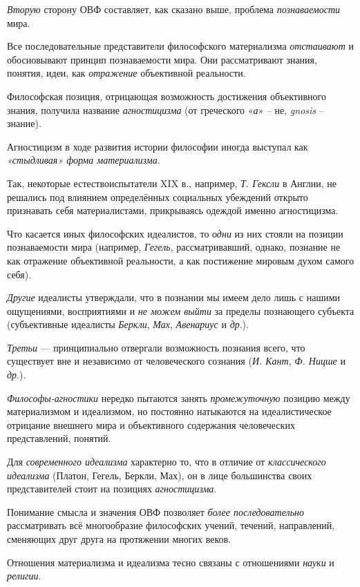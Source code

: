 \documentclass[a4paper,14pt,russian]{extreport}
\begin{document}
\emph{Вторую} сторону ОВФ составляет, как сказано выше, проблема \emph{познаваемости} мира.

Все последовательные представители философского материализма \emph{отстаивают} и обосновывают принцип познаваемости мира. Они рассматривают знания, понятия, идеи, как \emph{отражение} объективной реальности.

Философская позиция, отрицающая возможность достижения объективного знания, получила название \emph{агностицизма} (от греческого «\emph{а}» -- не, \emph{gnosis} -- знание).

Агностицизм в ходе развития истории философии иногда выступал как \emph{«стыдливая» форма материализма}.

Так, некоторые естествоиспытатели XIX в., например, \emph{Т. Гексли} в Англии, не решались под влиянием определённых социальных убеждений открыто признавать себя материалистами, прикрываясь одеждой именно агностицизма.

Что касается иных философских идеалистов, то \emph{одни} из них стояли на позиции познаваемости мира (например, \emph{Гегель}, рассматривавший, однако, познание не как отражение объективной реальности, а как постижение мировым духом самого себя).

\emph{Другие} идеалисты утверждали, что в познании мы имеем дело лишь с нашими ощущениями, восприятиями и \emph{не можем выйти} за пределы познающего субъекта (субъективные идеалисты \emph{Беркли}, \emph{Мах}, \emph{Авенариус} и \emph{др}.).

\emph{Третьи} --- принципиально отвергали возможность познания всего, что существует вне и независимо от человеческого сознания (\emph{И. Кант}, \emph{Ф. Ницше} и \emph{др}.).

\emph{Философы-агностики} нередко пытаются занять \emph{промежуточную} позицию между материализмом и идеализмом, но постоянно натыкаются на идеалистическое отрицание внешнего мира и объективного содержания человеческих представлений, понятий.

Для \emph{современного идеализма} характерно то, что в отличие от \emph{классического идеализма} (Платон, Гегель, Беркли, Мах), он в лице большинства своих представителей стоит на позициях \emph{агностицизма}.

Понимание смысла и значения ОВФ позволяет \emph{более последовательно} рассматривать всё многообразие философских учений, течений, направлений, сменяющих друг друга на протяжении многих веков.

Отношения материализма и идеализма тесно связаны с отношениями \emph{науки} и \emph{религии}.
\end{document}
